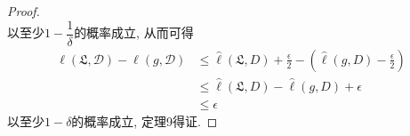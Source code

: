 \begin{proof}
\begin{equation}
\end{equation}
以至少$1-\dfrac{1}{\delta}$的概率成立, 从而可得
\begin{equation}
\begin{aligned}
\ell \left( \mathfrak{L},\mathcal{D} \right) -\ell \left( g,\mathcal{D} \right) &\le \hat{\ell}\left( \mathfrak{L},D \right) +\frac{\epsilon}{2}-\left( \hat{\ell}\left( g,D \right) -\frac{\epsilon}{2} \right)\\
&\le \hat{\ell}\left( \mathfrak{L},D \right) -\hat{\ell}\left( g,D \right) +\epsilon \\
& \le \epsilon
\end{aligned}
\end{equation}
以至少$1-\delta$的概率成立, 定理9得证.
\end{proof}